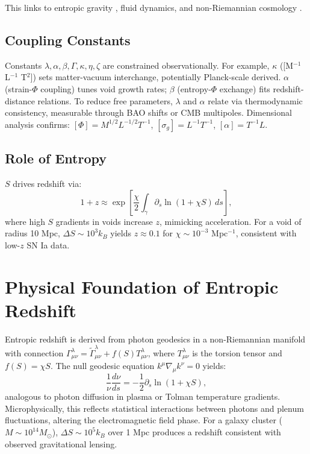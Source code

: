 \documentclass[11pt]{article}
\theoremstyle{plain}
\theoremstyle{definition}
\begin{document}
This links to entropic gravity \citep{Verlinde2011}, fluid dynamics, and non-Riemannian cosmology \citep{Shao2023}.

\subsection{Coupling Constants}
\label{subsec:coupling_constants}
Constants $\lambda, \alpha, \beta, \Gamma, \kappa, \eta, \zeta$ are constrained observationally. For example, $\kappa$ ([M$^{-1}$ L$^{-1}$ T$^2$]) sets matter-vacuum interchange, potentially Planck-scale derived. $\alpha$ (strain-$\Phi$ coupling) tunes void growth rates; $\beta$ (entropy-$\Phi$ exchange) fits redshift-distance relations. To reduce free parameters, $\lambda$ and $\alpha$ relate via thermodynamic consistency, measurable through BAO shifts or CMB multipoles. Dimensional analysis confirms: $[\Phi] = M^{1/2} L^{-1/2} T^{-1}$, $[\sigma_g] = L^{-1} T^{-1}$, $[\alpha] = T^{-1} L$.

\subsection{Role of Entropy}
$S$ drives redshift via:
\begin{equation}
1 + z \approx \exp\left[\frac{\chi}{2} \int_\gamma \partial_s \ln(1 + \chi S) \, ds\right],
\label{eq:redshift}
\end{equation}
where high $S$ gradients in voids increase $z$, mimicking acceleration. For a void of radius 10 Mpc, $\Delta S \sim 10^3 k_B$ yields $z \approx 0.1$ for $\chi \sim 10^{-3}$ Mpc$^{-1}$, consistent with low-$z$ SN Ia data.

\section{Physical Foundation of Entropic Redshift}
\label{sec:entropic_redshift}
Entropic redshift is derived from photon geodesics in a non-Riemannian manifold with connection $\Gamma^\lambda_{\mu\nu} = \tilde{\Gamma}^\lambda_{\mu\nu} + f(S) T^\lambda_{\mu\nu}$, where $T^\lambda_{\mu\nu}$ is the torsion tensor and $f(S) = \chi S$. The null geodesic equation $k^\mu \nabla_\mu k^\nu = 0$ yields:
\begin{equation}
\frac{1}{\nu} \frac{d\nu}{ds} = -\frac{1}{2} \partial_s \ln(1 + \chi S),
\label{eq:freq_shift}
\end{equation}
analogous to photon diffusion in plasma or Tolman temperature gradients. Microphysically, this reflects statistical interactions between photons and plenum fluctuations, altering the electromagnetic field phase. For a galaxy cluster ($M \sim 10^{14} M_\odot$), $\Delta S \sim 10^5 k_B$ over 1 Mpc produces a redshift consistent with observed gravitational lensing.
\end{document}
